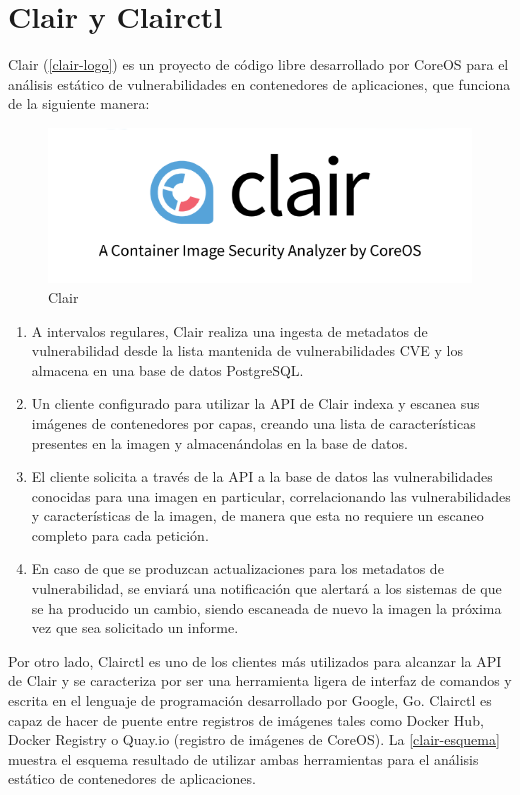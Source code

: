 \section{Clair y Clairctl}

Clair (\autoref{clair-logo}) es un proyecto de código libre desarrollado por CoreOS para el análisis estático de vulnerabilidades en contenedores de aplicaciones, que funciona de la siguiente manera\cite{clair2017}:

\begin{figure}[htbp]
	\centering
	\includegraphics[width=0.80\linewidth]
	{entorno/figuras/clair.png}
	\caption{Clair}
	\label{clair-logo}
\end{figure}

\begin{enumerate}
	\item A intervalos regulares, Clair realiza una ingesta de metadatos de vulnerabilidad desde la lista mantenida de vulnerabilidades \gls{CVE} y los almacena en una base de datos PostgreSQL.
	\item Un cliente configurado para utilizar la \gls{API} de Clair indexa y escanea sus imágenes de contenedores por capas, creando una lista de características presentes en la imagen y almacenándolas en la base de datos.
	\item El cliente solicita a través de la \gls{API} a la base de datos las vulnerabilidades conocidas para una imagen en particular, correlacionando las vulnerabilidades y características de la imagen, de manera que esta no requiere un escaneo completo para cada petición.
	\item En caso de que se produzcan actualizaciones para los metadatos de vulnerabilidad, se enviará una notificación que alertará a los sistemas de que se ha producido un cambio, siendo escaneada de nuevo la imagen la próxima vez que sea solicitado un informe.
\end{enumerate}

Por otro lado, Clairctl es uno de los clientes más utilizados para alcanzar la \gls{API} de Clair y se caracteriza por ser una herramienta ligera de interfaz de comandos y escrita en el lenguaje de programación desarrollado por Google, Go. Clairctl es capaz de hacer de puente entre registros de imágenes tales como Docker Hub, Docker Registry o Quay.io (registro de imágenes de CoreOS). La \autoref{clair-esquema} muestra el esquema resultado de utilizar ambas herramientas para el análisis estático de contenedores de aplicaciones.

